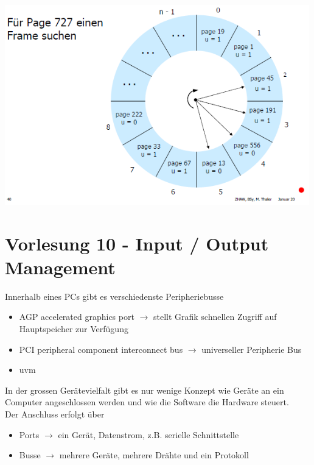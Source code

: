 \documentclass{report}
\newenvironment{Figure}
	{\par\medskip\noindent\minipage{\linewidth}}
	{\endminipage\par\medskip}
\theoremstyle{definition}
\theoremstyle{example}
\begin{document}
\begin{Figure}
\centering
\includegraphics[width=500px]{img/ReplacementPolicyClock.png}
	\label{fig:Abbildung der ReplacementPolicy: Clock}
\end{Figure}



\chapter{Vorlesung 10 - Input / Output Management}

Innerhalb eines PCs gibt es verschiedenste Peripheriebusse
\begin{itemize}
	\item AGP accelerated graphics port $\rightarrow$ stellt Grafik schnellen Zugriff auf Hauptspeicher zur Verfügung
	\item PCI peripheral component interconnect bus $\rightarrow$ universeller Peripherie Bus
	\item uvm
\end{itemize}

In der grossen Gerätevielfalt gibt es nur wenige Konzept wie Geräte an ein Computer angeschlossen werden und wie die Software die Hardware steuert.\\
Der Anschluss erfolgt über
\begin{itemize}
	\item Ports $\rightarrow$ ein Gerät, Datenstrom, z.B. serielle Schnittstelle
	\item Busse $\rightarrow$ mehrere Geräte, mehrere Drähte und ein Protokoll
\end{itemize}
\end{document}
